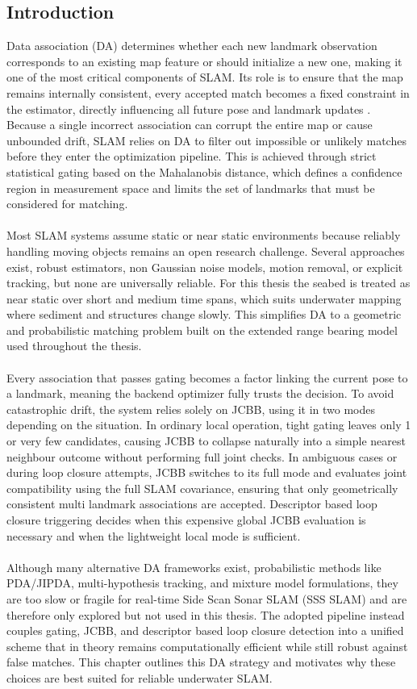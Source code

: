 \subsection{Introduction}
Data association (DA) determines whether each new landmark observation corresponds to an existing map feature or should initialize a new one, making it one of the most critical components of SLAM. Its role is to ensure that the map remains internally consistent, every accepted match becomes a fixed constraint in the estimator, directly influencing all future pose and landmark updates \cite{DA_review}. Because a single incorrect association can corrupt the entire map or cause unbounded drift, SLAM relies on DA to filter out impossible or unlikely matches before they enter the optimization pipeline. This is achieved through strict statistical gating based on the Mahalanobis distance, which defines a confidence region in measurement space and limits the set of landmarks that must be considered for matching.
\\ \\
Most SLAM systems assume static or near static environments because reliably handling moving objects remains an open research challenge. Several approaches exist, robust estimators, non Gaussian noise models, motion removal, or explicit tracking, but none are universally reliable. For this thesis the seabed is treated as near static over short and medium time spans, which suits underwater mapping where sediment and structures change slowly. This simplifies DA to a geometric and probabilistic matching problem built on the extended range bearing model used throughout the thesis.
\\ \\
Every association that passes gating becomes a factor linking the current pose to a landmark, meaning the backend optimizer fully trusts the decision. To avoid catastrophic drift, the system relies solely on JCBB, using it in two modes depending on the situation. In ordinary local operation, tight gating leaves only 1 or very few candidates, causing JCBB to collapse naturally into a simple nearest neighbour outcome without performing full joint checks. In ambiguous cases or during loop closure attempts, JCBB switches to its full mode and evaluates joint compatibility using the full SLAM covariance, ensuring that only geometrically consistent multi landmark associations are accepted. Descriptor based loop closure triggering decides when this expensive global JCBB evaluation is necessary and when the lightweight local mode is sufficient.
\\ \\
Although many alternative DA frameworks exist, probabilistic methods like PDA/JIPDA, multi-hypothesis tracking, and mixture model formulations, they are too slow or fragile for real-time Side Scan Sonar SLAM (SSS SLAM) and are therefore only explored but not used in this thesis. The adopted pipeline instead couples gating, JCBB, and descriptor based loop closure detection into a unified scheme that in theory remains computationally efficient while still robust against false matches. This chapter outlines this DA strategy and motivates why these choices are best suited for reliable underwater SLAM.

